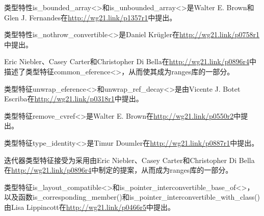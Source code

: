 类型特性is\_bounded\_array<>和is\_unbounded\_array<>是Walter E. Brown和Glen J. Fernandes在\url{http://wg21.link/p1357r1}中提出。

类型特性is\_nothrow\_convertible<>是Daniel Kr{\"u}gler在\url{http://wg21.link/p0758r1}中提出。

Eric Niebler、Casey Carter和Christopher Di Bella在\url{http://wg21.link/p0896r4}中描述了类型特征common\_eference<>，从而使其成为ranges库的一部分。

类型特征unwrap\_eference<>和unwrap\_ref\_decay<>是由Vicente J. Botet Escriba在\url{http://wg21.link/p0318r1}中提出。

类型特征remove\_cvref<>是Walter E. Brown在\url{http://wg21.link/p0550r2}中提出。

类型特征type\_identity<>是Timur Doumler在\url{http://wg21.link/p0887r1}中提出。

迭代器类型特征接受为采用由Eric Niebler、Casey Carter和Christopher Di Bella在\url{http://wg21.link/p0896r4}中制定的提案，从而成为ranges库的一部分。

类型特征is\_layout\_compatible<>和is\_pointer\_interconvertible\_base\_of<>，以及函数is\_corresponding\_member()和is\_pointer\_interconvertible\_with\_class()由Lisa Lippincott在\url{http://wg21.link/p0466r5}中提出。